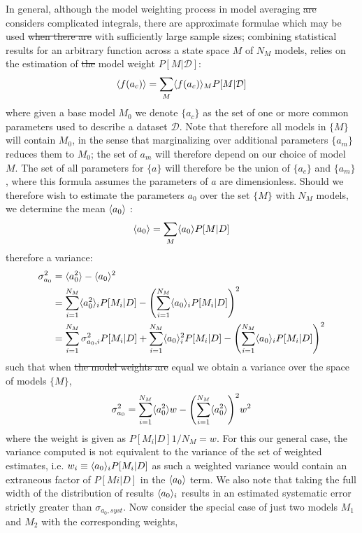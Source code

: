 \documentclass[10pt]{article}[draft]
\begin{document}
In general, although the model weighting process in model averaging \st{are} considers complicated integrals,  there are approximate formulae which may be used \st{when there are} with sufficiently large sample sizes; combining statistical results for an arbitrary function across a state space ${M}$ of $N_M$ models, relies on the estimation of \st{the} model weight $P[M|\mathcal{D}]$:
\begin{equation}
	\inn{f(a_c)} = \sum_M 	\inn{f(a_c)}_M P[M|\mathcal{D}]
\end{equation}
where given a base model $M_0$  we denote $\{a_c\}$ as the set of one or more common parameters used to describe a dataset $\mathcal{D}$. Note that therefore  all models in $\{M\}$ will contain $M_0$, in the sense that marginalizing over additional parameters $\{a_m\}$ reduces them to $M_0$; the set of $a_m$ will therefore depend on our choice of model $M$.  The set of all parameters for $\{a\}$ will therefore be the union of $\{a_c\}$ and $\{a_m\}$, where this formula assumes the parameters of $a$ are dimensionless. Should we therefore wish to estimate the parameters $a_0$ over the set $\{M\}$ with $N_M$ models, we determine the mean $\inn{a_0}$ \cite{kass1995bayes}:
\begin{equation}
	\inn{a_0} = \sum_M  \inn{a_0}  P[M|D]
\end{equation}
therefore a variance:
\begin{equation}
\begin{split}
\sigma_{a_0}^2 & = 	\inn{a_0^2} - 	\inn{a_0}^2  \\
& =  \sum_{i=1}^{N_M}  \inn{a_0^2}_i  P[M_i|D] - \Biggl( \sum_{i=1}^{N_M}  \inn{a_0}_i  P[M_i|D] \Biggr)^2 \\
& =  \sum_{i=1}^{N_M} \sigma_{a_0,i}^2 P[M_i|D] +  \sum_{i=1}^{N_M}  \inn{a_0}_i^2  P[M_i|D] - \Biggl( \sum_{i=1}^{N_M}  \inn{a_0}_i  P[M_i|D] \Biggr)^2 \\
\end{split}
\end{equation}
such that when \st{the model weights are} equal we obtain a variance over the space of models $\{M\}$,
\begin{equation}
	\begin{split}
	\sigma_{a_0}^2 =  \sum_{i=1}^{N_M}  \inn{a_0^2} w - \Biggl( \sum_{i=1}^{N_M} \inn{a_0^2} \Biggr)^2 w^2
	\end{split}
\label{general_form}
\end{equation}
where the weight is given as $P[M_i|D]  {1/N_M} = w$. For this our general case, the variance computed is not equivalent to the variance of the set of weighted estimates, i.e. $w_i \equiv \inn{a_0}_i P[M_i | D]$ as such a weighted variance would contain an extraneous factor of $P[Mi|D]$ in the $\inn{a_0}$ term. We also note that taking the full width of the distribution of results $\inn{a_0}_i$ results in an estimated systematic error strictly greater than $\sigma_{a_0,syst}$. Now consider the special case of just two models $M_1$ and $M_2$ with the corresponding weights,
\end{document}
